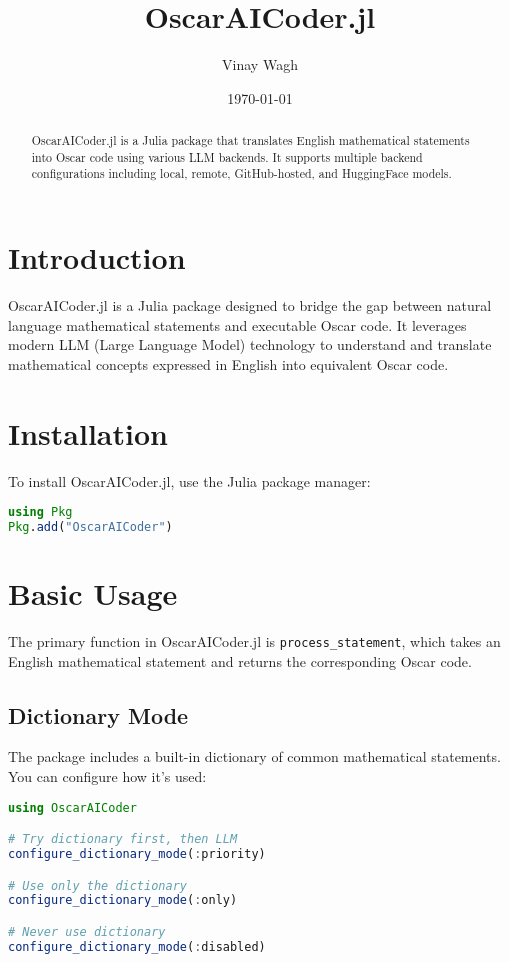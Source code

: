 \documentclass[11pt,a4paper]{article}
\title{\textbf{OscarAICoder.jl}}
\author{Vinay Wagh}
\date{\today}
\begin{document}
\maketitle

\begin{abstract}
OscarAICoder.jl is a Julia package that translates English mathematical statements into Oscar code using various LLM backends. It supports multiple backend configurations including local, remote, GitHub-hosted, and HuggingFace models.
\end{abstract}

\tableofcontents

\section{Introduction}

OscarAICoder.jl is a Julia package designed to bridge the gap between natural language mathematical statements and executable Oscar code. It leverages modern LLM (Large Language Model) technology to understand and translate mathematical concepts expressed in English into equivalent Oscar code.

\section{Installation}

To install OscarAICoder.jl, use the Julia package manager:

\begin{lstlisting}[language=Julia]
using Pkg
Pkg.add("OscarAICoder")
\end{lstlisting}

\section{Basic Usage}

The primary function in OscarAICoder.jl is \texttt{process\_statement}, which takes an English mathematical statement and returns the corresponding Oscar code.

\subsection{Dictionary Mode}

The package includes a built-in dictionary of common mathematical statements. You can configure how it's used:

\begin{lstlisting}[language=Julia]
using OscarAICoder

# Try dictionary first, then LLM
configure_dictionary_mode(:priority)

# Use only the dictionary
configure_dictionary_mode(:only)

# Never use dictionary
configure_dictionary_mode(:disabled)
\end{lstlisting}
\end{document}

